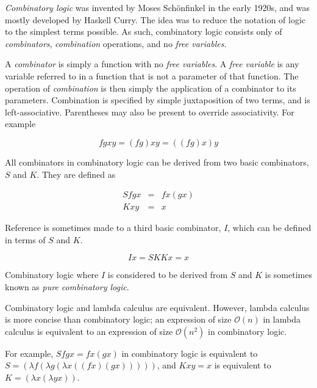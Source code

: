 \documentclass[12pt]{article}
\begin{document}
\emph{Combinatory logic} was invented by Moses Sch\"onfinkel in the early 1920s, and was mostly developed by Haskell Curry.  The idea was to reduce the notation of logic to the simplest terms possible.  As such, combinatory logic consists only of \emph{combinators}, \emph{combination} operations, and no \emph{free variables}.

A \emph{combinator} is simply a function with no \emph{free variables}.  A \emph{free variable} is any variable referred to in a function that is not a parameter of that function.  The operation of \emph{combination} is then simply the application of a combinator to its parameters.  Combination is specified by simple juxtaposition of two terms, and is left-associative.  Parentheses may also be present to override associativity.  For example

$$
f g x y = (f g) x y = ((f g) x) y
$$

All combinators in combinatory logic can be derived from two basic combinators, $S$ and $K$.  They are defined as

\begin{eqnarray*}
S f g x & = & f x (g x) \\
K x y & = & x
\end{eqnarray*}

Reference is sometimes made to a third basic combinator, $I$, which can be defined in terms of $S$ and $K$.

$$
I x = S K K x = x
$$

Combinatory logic where $I$ is considered to be derived from $S$ and $K$ is sometimes known as \emph{pure combinatory logic}.

Combinatory logic and lambda calculus are equivalent.  However, lambda calculus is more concise than combinatory logic; an expression of size $\mathcal{O}(n)$ in lambda calculus is equivalent to an expression of size $\mathcal{O}(n^2)$ in combinatory logic.

For example, $S f g x = f x (g x)$ in combinatory logic is equivalent to
$S = (\lambda f (\lambda g (\lambda x ((f x) (g x)))))$, and $K x y = x$
is equivalent to $K = (\lambda x (\lambda y x))$.
\end{document}
